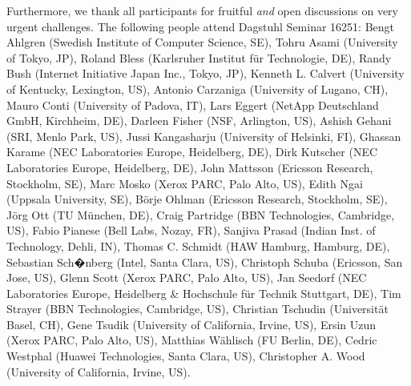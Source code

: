 \documentclass{sig-alternate-10pt}
\begin{document}
Furthermore, we thank all participants for fruitful \emph{and} open discussions
on very urgent challenges. The following people attend Dagstuhl Seminar 16251:
    Bengt Ahlgren (Swedish Institute of Computer Science, SE),
    Tohru Asami (University of Tokyo, JP),
    Roland Bless (Karlsruher Institut f\"ur Technologie, DE),
    Randy Bush (Internet Initiative Japan Inc., Tokyo, JP),
    Kenneth L. Calvert (University of Kentucky, Lexington, US),
    Antonio Carzaniga (University of Lugano, CH),
    Mauro Conti (University of Padova, IT),
    Lars Eggert (NetApp Deutschland GmbH, Kirchheim, DE),
    Darleen Fisher (NSF, Arlington, US),
    Ashish Gehani (SRI, Menlo Park, US),
    Jussi Kangasharju (University of Helsinki, FI),
    Ghassan Kar\-ame (NEC Laboratories Europe, Heidelberg, DE),
    Dirk Kut\-scher (NEC Laboratories Europe, Heidelberg, DE),
    John Mattsson (Ericsson Research, Stockholm, SE),
    Marc Mosko (Xerox PARC, Palo Alto, US),
    Edith Ngai (Uppsala University, SE),
    B\"orje Ohlman (Ericsson Research, Stockholm, SE),
    J\"org Ott (TU M\"unchen, DE),
    Craig Partridge (BBN Technologies, Cambridge, US),
    Fabio Pianese (Bell Labs, Nozay, FR),
    Sanjiva Prasad (Indian Inst. of Technology, Dehli, IN),
    Thomas C. Schmidt (HAW Hamburg, Hamburg, DE),
    Sebastian Sch�nberg (Intel, Santa Clara, US),
    Christoph Schuba (Ericsson, San Jose, US),
    Glenn Scott (Xerox PARC, Palo Alto, US),
    Jan Seedorf (NEC Laboratories Europe, Heidelberg \& Hochschule f\"ur Technik Stuttgart, DE),
    Tim Strayer (BBN Technologies, Cambridge, US),
    Christian Tschudin (Universit\"at Basel, CH),
    Gene Tsudik (University of California, Irvine, US),
    Ersin Uzun (Xerox PARC, Palo Alto, US),
    Matthias W\"ahlisch (FU Berlin, DE),
    Cedric Westphal (Huawei Technologies, Santa Clara, US),
    Christopher A. Wood (University of California, Irvine, US).

\small


\end{document}
